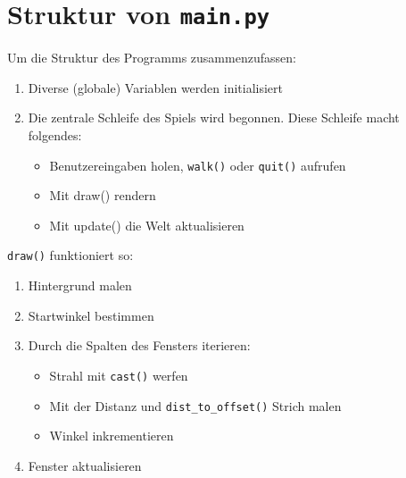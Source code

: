 \documentclass[a4paper,12pt]{report}
\begin{document}
\section{Struktur von \texttt{main.py}}
Um die Struktur des Programms zusammenzufassen:
\begin{spacing}{1.0}
\begin{framed}
\begin{enumerate}
	\item Diverse (globale) Variablen werden initialisiert
	\item Die zentrale Schleife des Spiels wird begonnen. Diese Schleife macht folgendes:
	\begin{itemize}
		\item Benutzereingaben holen, \texttt{walk()} oder \texttt{quit()} aufrufen
		\item Mit draw() rendern
		\item Mit update() die Welt aktualisieren
	\end{itemize}
\end{enumerate}
\end{framed}
\end{spacing}

\texttt{draw()} funktioniert so:
\begin{spacing}{1.0}
\begin{framed}
\begin{enumerate}
	\item Hintergrund malen
	\item Startwinkel bestimmen
	\item Durch die Spalten des Fensters iterieren:
	\begin{itemize}
		\item Strahl mit \texttt{cast()} werfen
		\item Mit der Distanz und \texttt{dist\_to\_offset()} Strich malen
		\item Winkel inkrementieren
	\end{itemize}
	\item Fenster aktualisieren
\end{enumerate}
\end{framed}
\end{spacing}
\end{document}
